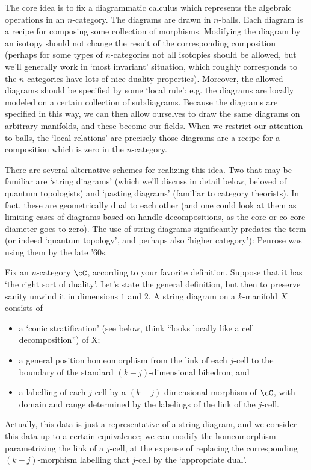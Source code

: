 \documentclass[11pt]{amsart}
\theoremstyle{plain}
\begin{document}
The core idea is to fix a diagrammatic calculus which represents the algebraic operations in an $n$-category. The diagrams are drawn in $n$-balls. Each diagram is a recipe for composing some collection of morphisms. Modifying the diagram by an isotopy should not change the result of the corresponding composition (perhaps for some types of $n$-categories not all isotopies should be allowed, but we'll generally work in `most invariant' situation, which roughly corresponds to the $n$-categories have lots of nice duality properties). Moreover, the allowed diagrams should be specified by some `local rule': e.g. the diagrams are locally modeled on a certain collection of subdiagrams. Because the diagrams are specified in this way, we can then allow ourselves to draw the same diagrams on arbitrary manifolds, and these become our fields. When we restrict our attention to balls, the `local relations' are precisely those diagrams are a recipe for a composition which is zero in the $n$-category.

There are several alternative schemes for realizing this idea. Two that may be familiar are `string diagrams' (which we'll discuss in detail below, beloved of quantum topologists) and `pasting diagrams' (familiar to category theorists). In fact, these are geometrically dual to each other (and one could look at them as limiting cases of diagrams based on handle decompositions, as the core or co-core diameter goes to zero). The use of string diagrams significantly predates the term (or indeed `quantum topology', and perhaps also `higher category'): Penrose was using them by the late '60s.

Fix an $n$-category $\cC$, according to your favorite definition. Suppose that it has `the right sort of duality'. Let's state the general definition, but then to preserve sanity unwind it in dimensions $1$ and $2$.
A string diagram on a $k$-manifold $X$ consists of
\begin{itemize}
\item a `conic stratification' (see below, think ``looks locally like a cell decomposition'') of X;
\item a general position homeomorphism from the link of each $j$-cell to the boundary of the standard $(k-j)$-dimensional bihedron; and
\item a labelling of each $j$-cell by a $(k-j)$-dimensional morphism of $\cC$, with domain and range determined by the labelings of the link of the $j$-cell.
\end{itemize}
Actually, this data is just a representative of a string diagram, and we consider this data up to a certain equivalence; we can modify the homeomorphism parametrizing the link of a $j$-cell, at the expense of replacing the corresponding $(k-j)$-morphism labelling that $j$-cell by the `appropriate dual'.
\end{document}

